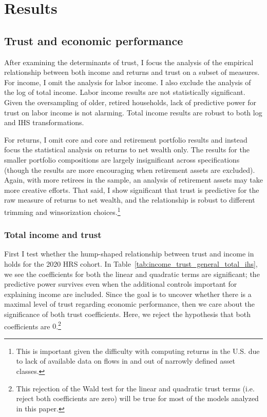 \onlyinsubfile{\setcounter{section}{3}}
\section{Results}\notinsubfile{\label{sec:results}}

\subsection{Trust and economic performance}

\par After examining the determinants of trust, I focus the analysis of the empirical relationship between both income and returns and trust on a subset of measures. For income, I omit the analysis for labor income. I also exclude the analysis of the log of total income. Labor income results are not statistically significant. Given the oversampling of older, retired households, lack of predictive power for trust on labor income is not alarming. Total income results are robust to both log and IHS transformations.

\par For returns, I omit core and core and retirement portfolio results and instead focus the statistical analysis on returns to net wealth only. The results for the smaller portfolio compositions are largely insignificant across specifications (though the results are more encouraging when retirement assets are excluded). Again, with more retirees in the sample, an analysis of retirement assets may take more creative efforts. That said, I show significant that trust is predictive for the raw measure of returns to net wealth, and the relationship is robust to different trimming and winsorization choices.\footnote{This is important given the difficulty with computing returns in the U.S. due to lack of available data on flows in and out of narrowly defined asset classes. }

\subsubsection{Total income and trust}

\par First I test whether the hump-shaped relationship between trust and income in \cite{jbpglg2016} holds for the 2020 HRS cohort. In Table~\ref{tab:income_trust_general_total_ihs}, we see the coefficients for both the linear and quadratic terms are significant; the predictive power survives even when the additional controls important for explaining income are included. Since the goal is to uncover whether there is a maximal level of trust regarding economic performance, then we care about the significance of both trust coefficients. Here, we reject the hypothesis that both coefficients are $0$.\footnote{This rejection of the Wald test for the linear and quadratic trust terms (i.e. reject both coefficients are zero) will be true for most of the models analyzed in this paper.}

